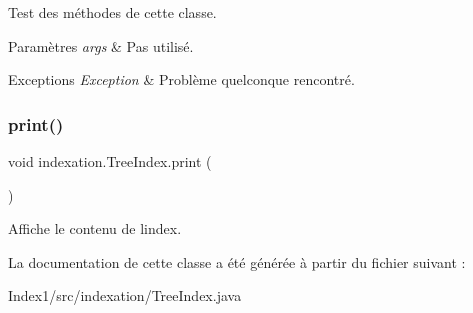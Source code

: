 Test des méthodes de cette classe.


\begin{DoxyParams}{Paramètres}
{\em args} & Pas utilisé.\\
\hline
\end{DoxyParams}

\begin{DoxyExceptions}{Exceptions}
{\em Exception} & Problème quelconque rencontré. \\
\hline
\end{DoxyExceptions}
\mbox{\label{classindexation_1_1TreeIndex_a41a0e0e561611ded850490635451b6a3}} 
\subsubsection{\texorpdfstring{print()}{print()}}
{\footnotesize\ttfamily void indexation.\+Tree\+Index.\+print (\begin{DoxyParamCaption}{ }\end{DoxyParamCaption})}

Affiche le contenu de l\textquotesingle{}index. 

La documentation de cette classe a été générée à partir du fichier suivant \+:\begin{DoxyCompactItemize}
\item 
Index1/src/indexation/Tree\+Index.\+java\end{DoxyCompactItemize}
